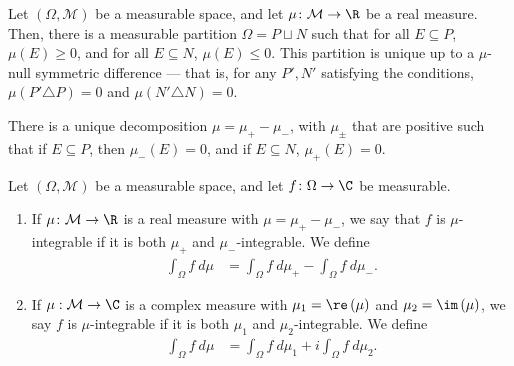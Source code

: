\begin{theorem}
  Let $\left(\Omega,\mathcal{M}\right)$ be a measurable space, and let $\mu\colon \mathcal{M}\rightarrow \R$ be a real measure. Then, there is a measurable partition $\Omega = P\sqcup N$ such that for all $E\subseteq P$, $\mu(E) \geq 0$, and for all $E\subseteq N$, $\mu(E) \leq 0$. This partition is unique up to a $\mu$-null symmetric difference --- that is, for any $P',N'$ satisfying the conditions, $\mu\left(P'\triangle P\right) = 0$ and $\mu\left(N'\triangle N\right) = 0$.\newline

  There is a unique decomposition $\mu = \mu_{+} - \mu_{-}$, with $\mu_{\pm}$ that are positive such that if $E\subseteq P$, then $\mu_{-}\left(E\right) = 0$, and if $E\subseteq N$, $\mu_{+}\left(E\right) = 0$.
\end{theorem}
\begin{definition}
  Let $\left(\Omega,\mathcal{M}\right)$ be a measurable space, and let $f\colon \Omega\rightarrow \C$ be measurable.
  \begin{enumerate}[(1)]
    \item If $\mu\colon \mathcal{M}\rightarrow \R$ is a real measure with $\mu = \mu_{+} - \mu_{-}$, we say that $f$ is $\mu$-integrable if it is both $\mu_{+}$ and $\mu_{-}$-integrable. We define
      \begin{align*}
        \int_{\Omega}^{} f\:d\mu &= \int_{\Omega}^{} f\:d\mu_{+} - \int_{\Omega}^{} f\:d\mu_{-}.
      \end{align*}
    \item If $\mu:\mathcal{M}\rightarrow \C$ is a complex measure with $\mu_{1} = \re\left(\mu\right)$ and $\mu_{2} = \im\left(\mu\right)$, we say $f$ is $\mu$-integrable if it is both $\mu_{1}$ and $\mu_{2}$-integrable. We define
      \begin{align*}
        \int_{\Omega}^{} f\:d\mu &= \int_{\Omega}^{} f\:d\mu_{1} + i\int_{\Omega}^{} f\:d\mu_{2}.
      \end{align*}
  \end{enumerate}
\end{definition}
